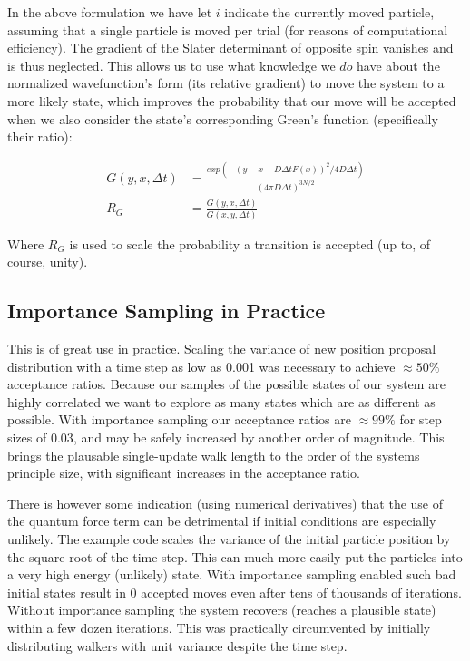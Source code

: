 \documentclass[11pt, conference, compsocconf]{IEEEtran}
\begin{document}
In the above formulation we have let $i$ indicate the currently moved particle, assuming that a single particle is moved per trial (for reasons of computational efficiency). The gradient of the Slater determinant of opposite spin vanishes and is thus neglected. This allows us to use what knowledge we $do$ have about the normalized wavefunction's form (its relative gradient) to move the system to a more likely state, which improves the probability that our move will be accepted when we also consider the state's corresponding Green's function (specifically their ratio): 

\begin{align}G\left(y,x,\Delta t\right) &= \frac{exp\left(-\left(y-x-D\Delta tF\left(x\right)\right)^2 /4D\Delta t\right)}{\left(4\pi D \Delta t\right)^{3N/2}}\\
R_G &=\frac{G\left(y,x,\Delta t\right)}{G\left(x,y,\Delta t\right)}\end{align}

Where $R_G$ is used to scale the probability a transition is accepted (up to, of course, unity).

\subsection{Importance Sampling in Practice}
This is of great use in practice. Scaling the variance of new position proposal distribution with a time step as low as 0.001 was necessary to achieve $\approx50\%$ acceptance ratios. Because our samples of the possible states of our system are highly correlated we want to explore as many states which are as different as possible. With importance sampling our acceptance ratios are $\approx99\%$ for step sizes of $0.03$, and may be safely increased by another order of magnitude. This brings the plausable single-update walk length to the order of the systems principle size, with significant increases in the acceptance ratio. 

There is however some indication (using numerical derivatives) that the use of the quantum force term can be detrimental if initial conditions are especially unlikely. The example code scales the variance of the initial particle position by the square root of the time step. This can much more easily put the particles into a very high energy (unlikely) state. With importance sampling enabled such bad initial states result in 0 accepted moves even after tens of thousands of iterations. Without importance sampling the system recovers (reaches a plausible state) within a few dozen iterations. This was practically circumvented by initially distributing walkers with unit variance despite the time step.
\end{document}
